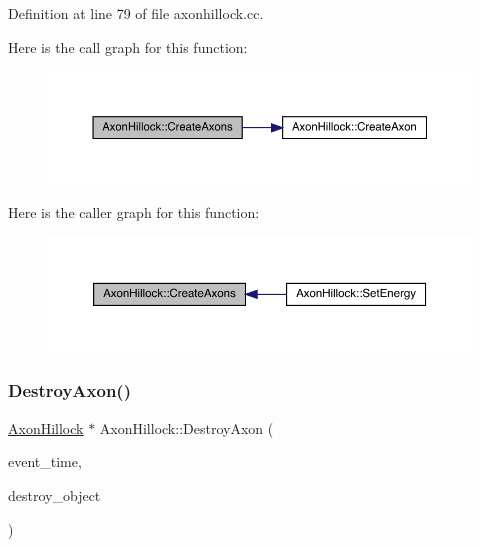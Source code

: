 Definition at line 79 of file axonhillock.\+cc.

Here is the call graph for this function\+:
\nopagebreak
\begin{figure}[H]
\begin{center}
\leavevmode
\includegraphics[width=350pt]{class_axon_hillock_a15bf1a433f38b8b0c92e4a4efe22ec6f_cgraph}
\end{center}
\end{figure}
Here is the caller graph for this function\+:
\nopagebreak
\begin{figure}[H]
\begin{center}
\leavevmode
\includegraphics[width=350pt]{class_axon_hillock_a15bf1a433f38b8b0c92e4a4efe22ec6f_icgraph}
\end{center}
\end{figure}
\mbox{\label{class_axon_hillock_a031b2cc7292d023506a5124639a941a7}} 
\subsubsection{\texorpdfstring{Destroy\+Axon()}{DestroyAxon()}}
{\footnotesize\ttfamily \hyperlink{class_axon_hillock}{Axon\+Hillock} $\ast$ Axon\+Hillock\+::\+Destroy\+Axon (\begin{DoxyParamCaption}\item[{std\+::chrono\+::time\+\_\+point$<$ \hyperlink{universe_8h_a0ef8d951d1ca5ab3cfaf7ab4c7a6fd80}{Clock} $>$}]{event\+\_\+time,  }\item[{\hyperlink{class_axon_hillock}{Axon\+Hillock} $\ast$}]{destroy\+\_\+object }\end{DoxyParamCaption})}



